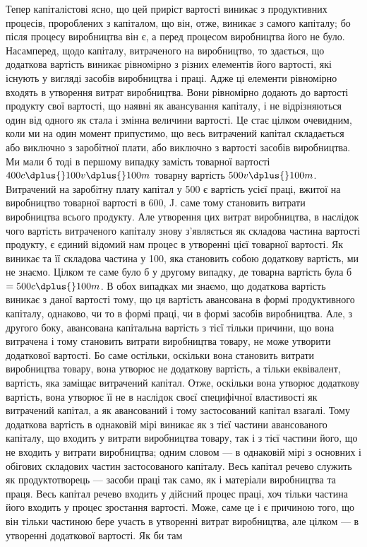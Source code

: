 
Тепер капіталістові ясно, що цей приріст вартості виникає
з продуктивних процесів, пророблених з капіталом, що він,
отже, виникає з самого капіталу; бо після процесу виробництва
він є, а перед процесом виробництва його не було. Насамперед,
щодо капіталу, витраченого на виробництво, то здається,
що додаткова вартість виникає рівномірно з різних елементів
його вартості, які існують у вигляді засобів виробництва і праці.
Адже ці елементи рівномірно входять в утворення витрат виробництва.
Вони рівномірно додають до вартості продукту свої
вартості, що наявні як авансування капіталу, і не відрізняються
один від одного як стала і змінна величини вартості. Це стає
цілком очевидним, коли ми на один момент припустимо, що
весь витрачений капітал складається або виключно з заробітної
плати, або виключно з вартості засобів виробництва. Ми мали б
тоді в першому випадку замість товарної вартості
$400 c \dplus{} 100 v \dplus{} 100 m$ товарну вартість $500 v \dplus{} 100 m$. Витрачений на заробітну
плату капітал у 500 є вартість усієї праці,
вжитої на виробництво товарної вартості в 600,
J. саме тому становить витрати виробництва всього продукту. Але
утворення цих витрат виробництва, в наслідок чого вартість витраченого
капіталу знову з’являється як складова частина вартості
продукту, є єдиний відомий нам процес в утворенні цієї товарної
вартості. Як виникає та її складова частина у 100,
яка становить собою додаткову вартість, ми не знаємо.
Цілком те саме було б у другому випадку, де товарна вартість
була б $= 500 c \dplus{} 100 m$. В обох випадках ми знаємо, що додаткова
вартість виникає з даної вартості тому, що ця вартість авансована
в формі продуктивного капіталу, однаково, чи то в формі праці,
чи в формі засобів виробництва. Але, з другого боку, авансована
капітальна вартість з тієї тільки причини, що вона витрачена
і тому становить витрати виробництва товару, не може
утворити додаткової вартості. Бо саме остільки, оскільки вона
становить витрати виробництва товару, вона утворює не додаткову
вартість, а тільки еквівалент, вартість, яка заміщає витрачений
капітал. Отже, оскільки вона утворює додаткову вартість,
вона утворює її не в наслідок своєї специфічної властивості як
витрачений капітал, а як авансований і тому застосований капітал
взагалі. Тому додаткова вартість в однаковій мірі виникає як
з тієї частини авансованого капіталу, що входить у витрати
виробництва товару, так і з тієї частини його, що не входить
у витрати виробництва; одним словом — в однаковій мірі з основних
і обігових складових частин застосованого капіталу. Весь
капітал речево служить як продуктотворець — засоби праці так
само, як і матеріали виробництва та праця. Весь капітал речево
входить у дійсний процес праці, хоч тільки частина його входить
у процес зростання вартості. Може, саме це і є причиною
того, що він тільки частиною бере участь в утворенні витрат виробництва,
але цілком — в утворенні додаткової вартості. Як би там
\parbreak{}  %
